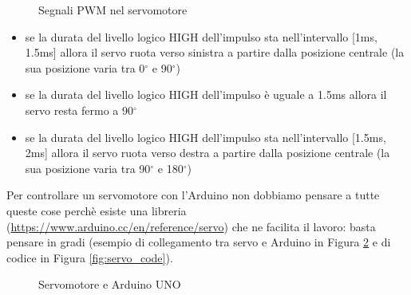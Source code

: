 \documentclass[12pt]{report}
\begin{document}
\begin{figure}
	\caption{Segnali PWM nel servomotore}
	\label{fig:servo_pwm}
\end{figure}


\begin{itemize}
	\item se la durata del livello logico HIGH dell'impulso sta nell'intervallo [1ms, 1.5ms] allora il servo ruota verso sinistra a partire dalla posizione centrale (la sua posizione varia tra 0$^{\circ}$ e 90$^{\circ}$)
	\item se la durata del livello logico HIGH dell'impulso è uguale a 1.5ms allora il servo resta fermo a 90$^{\circ}$
	\item se la durata del livello logico HIGH dell'impulso sta nell'intervallo [1.5ms, 2ms] allora il servo ruota verso destra a partire dalla posizione centrale (la sua posizione varia tra 90$^{\circ}$ e 180$^{\circ}$)
\end{itemize}

Per controllare un servomotore con l'Arduino non dobbiamo pensare a tutte queste cose perchè esiste una libreria (\url{https://www.arduino.cc/en/reference/servo}) che ne facilita il lavoro: basta pensare in gradi (esempio di collegamento tra servo e Arduino in Figura \ref{fig:servo_uno} e di codice in Figura \ref{fig:servo_code}).

\begin{figure}
	\caption{Servomotore e Arduino UNO}
	\label{fig:servo_uno}
\end{figure}
\end{document}
